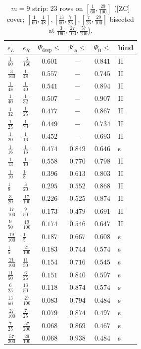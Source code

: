 \documentclass[11pt]{amsart}
\begin{document}
\begin{table}[p]\centering\small
\caption{$m=9$ strip: $23$ rows on $[\tfrac1{60},\tfrac{29}{100}]$ ([ZC] cover; $[\tfrac1{60},\tfrac1{48}],[\tfrac{13}{50},\tfrac7{25}],[\tfrac7{25},\tfrac{29}{100}]$ bisected at $\tfrac3{160},\tfrac{27}{100},\tfrac{57}{200}$).}\label{zc9:tab:m9}
\begin{tabular}{llcccl}\toprule
$e_L$&$e_R$&$\Psi_{\mathrm{deep}}\!\le$&$\Psi_{\mathrm{sh}}\!\le$&$\Psi_{\mathrm{II}}\!\le$&bind\\\midrule
$\tfrac{1}{60}$&$\tfrac{3}{160}$&$0.601$&$-$&$0.841$&II\\
$\tfrac{3}{160}$&$\tfrac{1}{48}$&$0.557$&$-$&$0.745$&II\\
$\tfrac{1}{48}$&$\tfrac{1}{40}$&$0.541$&$-$&$0.894$&II\\
$\tfrac{1}{40}$&$\tfrac{1}{32}$&$0.507$&$-$&$0.907$&II\\
$\tfrac{1}{32}$&$\tfrac{1}{25}$&$0.477$&$-$&$0.867$&II\\
$\tfrac{1}{25}$&$\tfrac{1}{20}$&$0.449$&$-$&$0.734$&II\\
$\tfrac{1}{20}$&$\tfrac{1}{16}$&$0.452$&$-$&$0.693$&II\\
$\tfrac{1}{16}$&$\tfrac{1}{13}$&$0.474$&$0.849$&$0.646$&s\\
$\tfrac{1}{13}$&$\tfrac{1}{10}$&$0.558$&$0.770$&$0.798$&II\\
$\tfrac{1}{10}$&$\tfrac{1}{8}$&$0.396$&$0.613$&$0.803$&II\\
$\tfrac{1}{8}$&$\tfrac{3}{20}$&$0.295$&$0.552$&$0.868$&II\\
$\tfrac{3}{20}$&$\tfrac{17}{100}$&$0.226$&$0.525$&$0.874$&II\\
$\tfrac{17}{100}$&$\tfrac{9}{50}$&$0.173$&$0.479$&$0.691$&II\\
$\tfrac{9}{50}$&$\tfrac{19}{100}$&$0.174$&$0.546$&$0.647$&II\\
$\tfrac{19}{100}$&$\tfrac{1}{5}$&$0.187$&$0.667$&$0.608$&s\\
$\tfrac{1}{5}$&$\tfrac{21}{100}$&$0.183$&$0.744$&$0.574$&s\\
$\tfrac{21}{100}$&$\tfrac{11}{50}$&$0.154$&$0.716$&$0.545$&s\\
$\tfrac{11}{50}$&$\tfrac{6}{25}$&$0.151$&$0.840$&$0.597$&s\\
$\tfrac{6}{25}$&$\tfrac{13}{50}$&$0.118$&$0.874$&$0.574$&s\\
$\tfrac{13}{50}$&$\tfrac{27}{100}$&$0.083$&$0.794$&$0.484$&s\\
$\tfrac{27}{100}$&$\tfrac{7}{25}$&$0.079$&$0.874$&$0.497$&s\\
$\tfrac{7}{25}$&$\tfrac{57}{200}$&$0.068$&$0.869$&$0.467$&s\\
$\tfrac{57}{200}$&$\tfrac{29}{100}$&$0.068$&$0.938$&$0.484$&s\\
\bottomrule\end{tabular}\end{table}
\end{document}
